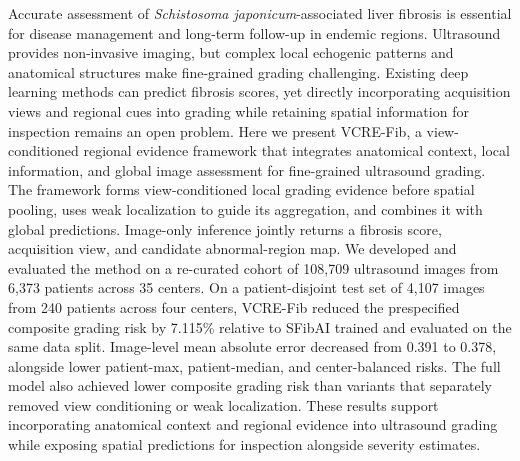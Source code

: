 Accurate assessment of \emph{Schistosoma japonicum}-associated liver fibrosis is essential for disease management and long-term follow-up in endemic regions. Ultrasound provides non-invasive imaging, but complex local echogenic patterns and anatomical structures make fine-grained grading challenging. Existing deep learning methods can predict fibrosis scores, yet directly incorporating acquisition views and regional cues into grading while retaining spatial information for inspection remains an open problem. Here we present VCRE-Fib, a view-conditioned regional evidence framework that integrates anatomical context, local information, and global image assessment for fine-grained ultrasound grading. The framework forms view-conditioned local grading evidence before spatial pooling, uses weak localization to guide its aggregation, and combines it with global predictions. Image-only inference jointly returns a fibrosis score, acquisition view, and candidate abnormal-region map. We developed and evaluated the method on a re-curated cohort of 108,709 ultrasound images from 6,373 patients across 35 centers. On a patient-disjoint test set of 4,107 images from 240 patients across four centers, VCRE-Fib reduced the prespecified composite grading risk by 7.115\% relative to SFibAI trained and evaluated on the same data split. Image-level mean absolute error decreased from 0.391 to 0.378, alongside lower patient-max, patient-median, and center-balanced risks. The full model also achieved lower composite grading risk than variants that separately removed view conditioning or weak localization. These results support incorporating anatomical context and regional evidence into ultrasound grading while exposing spatial predictions for inspection alongside severity estimates.
